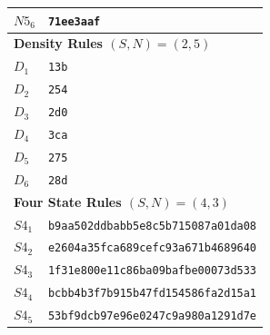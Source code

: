 \documentclass{elsarticle}
\begin{document}
\begin{multicols}{2}
\begin{table}[!htbp]
\begin{tabular}{|p{2cm}|l|}
			$N5_{6}$ & \verb|71ee3aaf|                         \\ \hline
			\multicolumn{2}{|l|}{\textbf{Density Rules \boldmath$(S,N) = (2,5)$}} \\ \hline
			$D_{1}$  & \verb|13b|                              \\ \hline
			$D_{2}$  & \verb|254|                              \\ \hline
			$D_{3}$  & \verb|2d0|                              \\ \hline
			$D_{4}$  & \verb|3ca|                              \\ \hline
			$D_{5}$  & \verb|275|                              \\ \hline
			$D_{6}$  & \verb|28d|                              \\ \hline
			\multicolumn{2}{|l|}{\textbf{Four State Rules \boldmath$(S,N) = (4,3)$}} \\ 
			\hline
			$S4_{1}$ & \verb|b9aa502ddbabb5e8c5b715087a01da08| \\ \hline
			$S4_{2}$ & \verb|e2604a35fca689cefc93a671b4689640| \\ \hline
			$S4_{3}$ & \verb|1f31e800e11c86ba09bafbe00073d533| \\ \hline
			$S4_{4}$ & \verb|bcbb4b3f7b915b47fd154586fa2d15a1| \\ \hline
			$S4_{5}$ & \verb|53bf9dcb97e96e0247c9a980a1291d7e| \\ \hline

\end{tabular}
\end{table}
\end{multicols}
\end{document}

